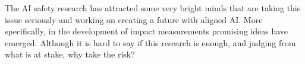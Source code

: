 \documentclass[12pt,A4]{report}
\theoremstyle{definition}
\begin{document}
The AI safety research has attracted some very bright minds that are taking this issue seriously and working on creating a future with aligned AI. More specifically, in the development of impact measurements promising ideas have emerged. Although it is hard to say if this research is enough, and judging from what is at stake, why take the risk?









\end{document}
